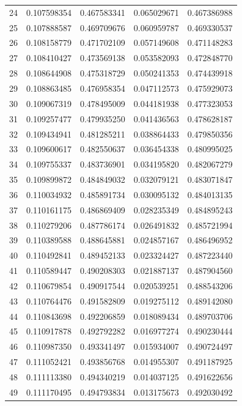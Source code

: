 \begin{tabular}{rcccc}
24 & 0.107598354 & 0.467583341 & 0.065029671 & 0.467386988 \\
25 & 0.107888587 & 0.469709676 & 0.060959787 & 0.469330537 \\
26 & 0.108158779 & 0.471702109 & 0.057149608 & 0.471148283 \\
27 & 0.108410427 & 0.473569138 & 0.053582093 & 0.472848770 \\
28 & 0.108644908 & 0.475318729 & 0.050241353 & 0.474439918 \\
29 & 0.108863485 & 0.476958354 & 0.047112573 & 0.475929073 \\
30 & 0.109067319 & 0.478495009 & 0.044181938 & 0.477323053 \\
31 & 0.109257477 & 0.479935250 & 0.041436563 & 0.478628187 \\
32 & 0.109434941 & 0.481285211 & 0.038864433 & 0.479850356 \\
33 & 0.109600617 & 0.482550637 & 0.036454338 & 0.480995025 \\
34 & 0.109755337 & 0.483736901 & 0.034195820 & 0.482067279 \\
35 & 0.109899872 & 0.484849032 & 0.032079121 & 0.483071847 \\
36 & 0.110034932 & 0.485891734 & 0.030095132 & 0.484013135 \\
37 & 0.110161175 & 0.486869409 & 0.028235349 & 0.484895243 \\
38 & 0.110279206 & 0.487786174 & 0.026491832 & 0.485721994 \\
39 & 0.110389588 & 0.488645881 & 0.024857167 & 0.486496952 \\
40 & 0.110492841 & 0.489452133 & 0.023324427 & 0.487223440 \\
41 & 0.110589447 & 0.490208303 & 0.021887137 & 0.487904560 \\
42 & 0.110679854 & 0.490917544 & 0.020539251 & 0.488543206 \\
43 & 0.110764476 & 0.491582809 & 0.019275112 & 0.489142080 \\
44 & 0.110843698 & 0.492206859 & 0.018089434 & 0.489703706 \\
45 & 0.110917878 & 0.492792282 & 0.016977274 & 0.490230444 \\
46 & 0.110987350 & 0.493341497 & 0.015934007 & 0.490724497 \\
47 & 0.111052421 & 0.493856768 & 0.014955307 & 0.491187925 \\
48 & 0.111113380 & 0.494340219 & 0.014037125 & 0.491622656 \\
49 & 0.111170495 & 0.494793834 & 0.013175673 & 0.492030492 \\

\end{tabular}
